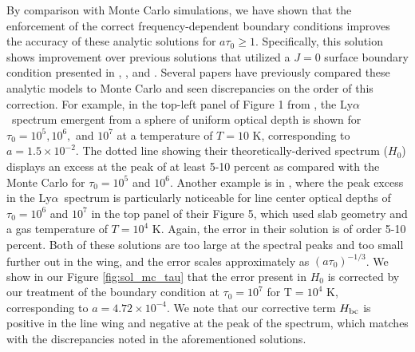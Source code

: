 \documentclass[linenumbers]{aastex63}
\newcommand\lya{Ly$\alpha$\ }
\begin{document}
By comparison with Monte Carlo simulations, we have shown that the enforcement of the correct frequency-dependent boundary conditions improves the accuracy of these analytic solutions for $a\tau_0 \geq 1$. Specifically, this solution shows improvement over previous solutions that utilized a $J=0$ surface boundary condition presented in \citet{1973MNRAS.162...43H}, \citet{1990ApJ...350..216N}, and \citet{2006ApJ...649...14D}. Several papers have previously compared these analytic models to Monte Carlo and seen discrepancies on the order of this correction. For example, in the top-left panel of Figure 1 from \citet{2006ApJ...649...14D}, the \lya spectrum emergent from a sphere of uniform optical depth is shown for $\tau_0=10^5, 10^6,$ and $10^7$ at a temperature of $T=10$ K, corresponding to $a=1.5 \times 10^{-2}$. The dotted line showing their theoretically-derived spectrum ($H_0$) displays an excess at the peak of at least 5-10 percent as compared with the Monte Carlo for $\tau_0=10^5$ and $10^6$. Another example is in \citet{2015MNRAS.449.4336S}, where the peak excess in the \lya spectrum is particularly noticeable for line center optical depths of $\tau_0=10^6$ and $10^7$ in the top panel of their Figure 5, which used slab geometry and a gas temperature of $T=10^4$ K. Again, the error in their solution is of order 5-10 percent. Both of these solutions are too large at the spectral peaks and too small further out in the wing, and the error scales approximately as $(a\tau_0)^{-1/3}$. We show in our Figure \ref{fig:sol_mc_tau} that the error present in $H_0$ is corrected by our treatment of the boundary condition at $\tau_0 = 10^7$ for T$=10^4$ K, corresponding to $a=4.72 \times 10^{-4}$. We note that our corrective term $H_{\rm bc}$ is positive in the line wing and negative at the peak of the spectrum, which matches with the discrepancies noted in the aforementioned solutions.
\end{document}
